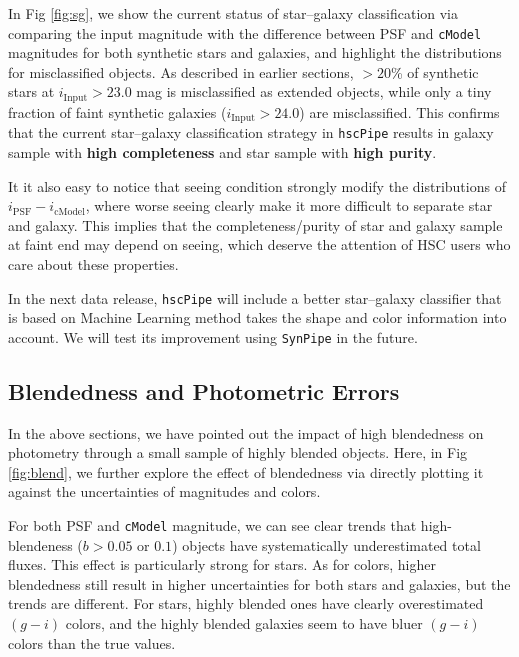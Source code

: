 \documentclass[useamsfonts]{pasj01}
\def\hscpipe{\texttt{hscPipe}}
\def\synpipe{\texttt{SynPipe}}
\def\cmodel{\texttt{cModel}}
\begin{document}
    In Fig \ref{fig:sg}, we show the current status of star--galaxy classification  
    via comparing the input magnitude with the difference between PSF and \cmodel{} 
    magnitudes for both synthetic stars and galaxies, and highlight the distributions 
    for misclassified objects. 
    As described in earlier sections, $>20$\% of synthetic stars at 
    $i_{\mathrm{Input}}>23.0$ mag is misclassified as extended objects, while only a 
    tiny fraction of faint synthetic galaxies ($i_{\mathrm{Input}}>24.0$) are 
    misclassified. 
    This confirms that the current star--galaxy classification strategy in \hscpipe{}
    results in galaxy sample with \textbf{high completeness} and star sample 
    with \textbf{high purity}.
    
    It it also easy to notice that seeing condition strongly modify the distributions 
    of $i_{\mathrm{PSF}}-i_{\mathrm{cModel}}$, where worse seeing clearly make it 
    more difficult to separate star and galaxy.  
    This implies that the completeness/purity of star and galaxy sample at faint end
    may depend on seeing, which deserve the attention of HSC users who care about 
    these properties.      
    
    In the next data release, \hscpipe{} will include a better star--galaxy classifier
    that is based on Machine Learning method takes the shape and color information 
    into account. 
    We will test its improvement using \synpipe{} in the future.
    
\subsection{Blendedness and Photometric Errors}
    \label{ssec:blendedness}

    In the above sections, we have pointed out the impact of high blendedness on 
    photometry through a small sample of highly blended objects.  
    Here, in Fig \ref{fig:blend}, we further explore the effect of blendedness via 
    directly plotting it against the uncertainties of magnitudes and colors. 
    
    For both PSF and \cmodel{} magnitude, we can see clear trends that high-blendeness
    ($b>0.05$ or $0.1$) objects have systematically underestimated total fluxes. 
    This effect is particularly strong for stars. 
    As for colors, higher blendedness still result in higher uncertainties for both 
    stars and galaxies, but the trends are different. 
    For stars, highly blended ones have clearly overestimated $(g-i)$ colors, and the 
    highly blended galaxies seem to have bluer $(g-i)$ colors than the true values. 
    
\end{document}
